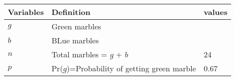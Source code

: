 \begin{tabular}{|l|l|l|}\hline
	Variables	&Definition &values\\ \hline
	$g$ &Green marbles & \\ \hline
	$b$ &BLue marbles & \\ \hline
	$n$	&Total marbles = $g$ + $b$ & 24\\ \hline
	$p$	&Pr($g$)=Probability of getting green marble & 0.67\\ \hline
\end{tabular}
